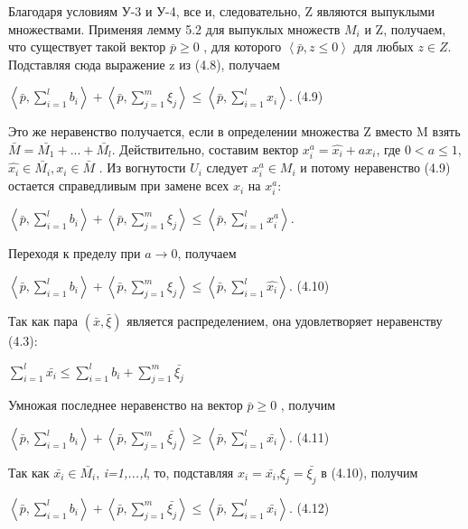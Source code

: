 \documentclass[12pt, 4paper]{book}
\begin{document}
{Благодаря условиям У-3 и У-4, все  и, следовательно, Z являются выпуклыми множествами. Применяя лемму 5.2 для выпуклых множеств $M_i$ и Z, получаем, что существует такой вектор $\bar{p} \geq 0$ , для которого $\left\langle \bar{p},z \leq 0\right\rangle$ для любых $z \in Z$. Подставляя сюда выражение z из (4.8), получаем
\begin{center}
$\left\langle \bar{p},\sum\limits_{i=1}^{l} b_i\right\rangle + \left\langle \bar{p}, \sum\limits_{j=1}^{m}\xi_j \right\rangle \leq \left\langle \bar{p}, \sum\limits_{i=1}^l x_i\right\rangle$. (4.9)
\end{center}
Это же неравенство получается, если в определении множества Z вместо M взять $\bar{M} = \bar{M_1} + ... + \bar{M_l}$. Действительно, составим вектор $x_{i}^{a}=\hat{x_i} + ax_i$, где $0 < a \leq 1$,$\hat{x_i} \in \bar{M_i},x_i \in \bar{M}$ . Из вогнутости $U_i$ следует $x_{i}^{a} \in M_i$ и потому неравенство (4.9) остается справедливым при замене всех $x_i$ на $x_{i}^{a}$:
\begin{center}
$\left\langle \bar{p},\sum\limits_{i=1}^{l} b_i\right\rangle + \left\langle \bar{p}, \sum\limits_{j=1}^{m}\xi_j \right\rangle \leq \left\langle \bar{p}, \sum\limits_{i=1}^l x_{i}^{a}\right\rangle$. 
\end{center}
Переходя к пределу при $a \rightarrow 0$, получаем
\begin{center}
$\left\langle \bar{p},\sum\limits_{i=1}^{l} b_i\right\rangle + \left\langle \bar{p}, \sum\limits_{j=1}^{m}\xi_j \right\rangle \leq \left\langle \bar{p}, \sum\limits_{i=1}^l \hat{x_{i}}\right\rangle$.  (4.10)
\end{center}
Так как пара $(\bar{x},\bar{\xi})$ является распределением, она удовлетворяет неравенству (4.3):
\begin{center}
$\sum\limits_{i=1}^{l} \bar{x_i} \leq \sum\limits_{i=1}^{l} b_i+ \sum\limits_{j=1}^{m} \bar{\xi_j}$
\end{center}
Умножая последнее неравенство на вектор $\bar{p}\geq 0$  , получим
\begin{center}
$\left\langle \bar{p},\sum\limits_{i=1}^{l} b_i\right\rangle + \left\langle \bar{p}, \sum\limits_{j=1}^{m} \bar{\xi_j} \right\rangle \geq \left\langle \bar{p}, \sum\limits_{i=1}^l \bar{x_{i}}\right\rangle$.  (4.11)
\end{center}
Так как $\bar{x_i} \in \bar{M_i}$, \textit{i=1,...,l}, то, подставляя $x_i = \bar{x_i}$,$\xi_j = \bar{\xi_j}$  в (4.10), получим
\begin{center}
$\left\langle \bar{p},\sum\limits_{i=1}^{l} b_i\right\rangle + \left\langle \bar{p}, \sum\limits_{j=1}^{m} \bar{\xi_j} \right\rangle \leq \left\langle \bar{p}, \sum\limits_{i=1}^l \bar{x_{i}}\right\rangle$.  (4.12)

\end{center}}
\end{document}
